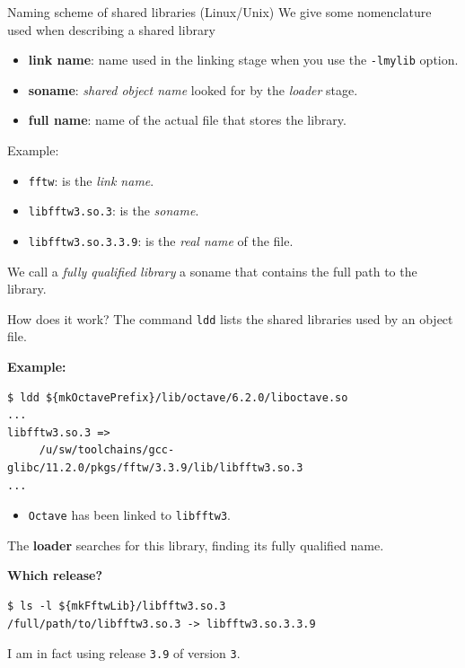 \documentclass[10pt,aspectratio=169]{beamer}
\begin{document}
\begin{frame}[fragile]{Naming scheme of shared libraries (Linux/Unix)}
  We give some nomenclature used when describing a shared library

  \begin{itemize}
      \item \textbf{link name}: name used in the linking stage when
    you use the \texttt{-lmylib} option.  
    \item \textbf{soname}: \textit{shared object name} looked for
    by the \emph{loader} stage.  
\item \textbf{full name}: name of the actual file that stores the library. 
  \end{itemize}
\medskip

    Example:
    \begin{itemize}
        \item[] \texttt{fftw}: is the \textit{link name}.
        \item[] \texttt{libfftw3.so.3}: is the \textit{soname}.
        \item[] \texttt{libfftw3.so.3.3.9}: is the \textit{real name} of the file.
    \end{itemize}

    We call a \textit{fully qualified library} a soname that contains the full path to the library.
\end{frame}


\begin{frame}[fragile]{How does it work?}  The command
  \texttt{ldd} lists the shared libraries used by an object file. \\
  \medskip
  
\textbf{Example:}
\begin{verbatim}
$ ldd ${mkOctavePrefix}/lib/octave/6.2.0/liboctave.so
...
libfftw3.so.3 =>
     /u/sw/toolchains/gcc-glibc/11.2.0/pkgs/fftw/3.3.9/lib/libfftw3.so.3
...
\end{verbatim}
\begin{itemize}
	\item \texttt{Octave} has been linked to \texttt{libfftw3}.
\end{itemize}

The \textbf{loader} searches for this library, finding its fully qualified name. \\ \medskip

\textbf{Which release?} 
\begin{verbatim}
$ ls -l ${mkFftwLib}/libfftw3.so.3
/full/path/to/libfftw3.so.3 -> libfftw3.so.3.3.9
\end{verbatim}
I am in fact using release \texttt{3.9} of version \texttt{3}.
\end{frame}
\end{document}
